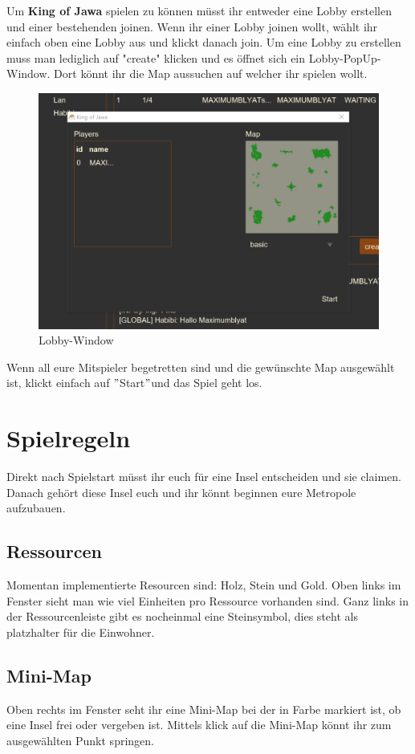 \documentclass{scrartcl}
\newcommand{\n}{\newline}
\begin{document}
Um \textbf{King of Jawa} spielen zu können müsst ihr entweder eine Lobby erstellen und einer bestehenden joinen. Wenn ihr einer Lobby joinen wollt, wählt ihr einfach oben eine Lobby aus und klickt danach join.\n
Um eine Lobby zu erstellen muss man lediglich auf "create" klicken und es öffnet sich ein Lobby-PopUp-Window. Dort könnt ihr die Map aussuchen auf welcher ihr spielen wollt.
\begin{figure}[H]
	\includegraphics[width=\linewidth]{Lobby.png}
	\caption{Lobby-Window}
	\label{fig:Lobby}
\end{figure}
Wenn all eure Mitspieler begetretten sind und die gewünschte Map ausgewählt ist, klickt einfach auf $"$Start$"$\space und das Spiel geht los.

\pagebreak
\section{Spielregeln}
Direkt nach Spielstart müsst ihr euch für eine Insel entscheiden und sie claimen. Danach gehört diese Insel euch und ihr könnt beginnen eure Metropole aufzubauen.
\subsection{Ressourcen}
Momentan implementierte Resourcen sind: Holz, Stein und Gold. Oben links im Fenster sieht man wie viel Einheiten pro Ressource vorhanden sind. Ganz links in der Ressourcenleiste gibt es nocheinmal eine Steinsymbol, dies steht als platzhalter für die Einwohner.
\subsection{Mini-Map}
Oben rechts im Fenster seht ihr eine Mini-Map bei der in Farbe markiert ist, ob eine Insel frei oder vergeben ist. Mittels klick auf die Mini-Map könnt ihr zum ausgewählten Punkt springen.
\end{document}
